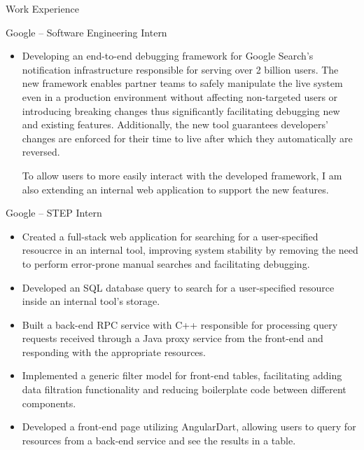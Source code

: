 \documentclass[]{article}
\newlength{\tabin}
\newlength{\secsep}
\newcommand{\lineunder}{\vspace*{-8pt} \\ \hspace*{-6pt} \hrulefill \\ \vspace*{-15pt}}
\newenvironment{tabbedsection}[1]{
  \begin{list}{}{
      \setlength{\itemsep}{0pt}
      \setlength{\labelsep}{0pt}
      \setlength{\labelwidth}{0pt}
      \setlength{\leftmargin}{\tabin}
      \setlength{\rightmargin}{\tabin}
      \setlength{\listparindent}{0pt}
      \setlength{\parsep}{0pt}
      \setlength{\parskip}{0pt}
      \setlength{\partopsep}{0pt}
      \setlength{\topsep}{#1}
    }
  \item[]
}{\end{list}}
\newenvironment{resume_section}[1]{
  \filbreak
  \vspace{2\secsep}
  \textsc{\large#1}
  \lineunder
  \begin{tabbedsection}{\secsep}
}{\end{tabbedsection}}
\newenvironment{resume_subsection}[2][]{
  \textbf{#2} \hfill {\footnotesize #1} \hspace{2em}
  \begin{tabbedsection}{0.5\secsep}
}{\end{tabbedsection}}
\newenvironment{subitems}{
  \renewcommand{\labelitemi}{-}
  \begin{itemize}
      \setlength{\labelsep}{1em}
}{\end{itemize}}
\begin{document}
\begin{resume_section}{Work Experience}

	\begin{resume_subsection}[Boulder, CO (2023.05 -- 2023.08)]{Google -- Software Engineering Intern}

		\begin{subitems}

			\item Developing an end-to-end debugging framework for Google Search's notification
			infrastructure responsible for serving over 2 billion users. The new framework enables
			partner teams to safely manipulate the live system even in a production environment
			without affecting non-targeted users or introducing breaking changes thus significantly
			facilitating debugging new and existing features. Additionally, the new tool
			guarantees developers' changes are enforced for their time to live after which
			they automatically are reversed.

			\subitem To allow users to more easily interact with the developed framework, I am
			also extending an internal web application to support the new features.

		\end{subitems}

	\end{resume_subsection}

	\begin{resume_subsection}[Irvine, CA (2022.05 -- 2022.08)]{Google -- STEP Intern}

		\begin{subitems}

			\item Created a full-stack web application for searching for a user-specified resoucrce
			in an internal tool, improving system stability by removing the need to perform
			error-prone manual searches and facilitating debugging.

			\item Developed an SQL database query to search for a user-specified resource inside
			an internal tool's storage.

			\item Built a back-end RPC service with C++ responsible for processing query requests
			received through a Java proxy service from the front-end and responding with the
			appropriate resources.

			\item Implemented a generic filter model for front-end tables, facilitating adding
			data filtration functionality and reducing boilerplate code between different components.

			\item Developed a front-end page utilizing AngularDart, allowing users to query for
			resources from a back-end service and see the results in a table.

		\end{subitems}

	\end{resume_subsection}

\end{resume_section}
\end{document}
